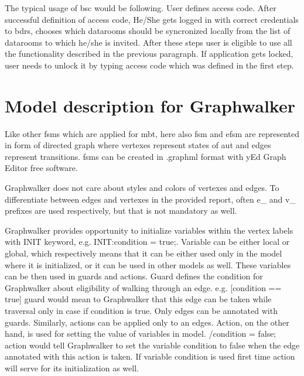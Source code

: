 \par
The typical usage of \acrshort{bsc} would be following. User defines access code. After successful definition of access code, He/She gets logged in with correct credentials to \acrshort{bdrs}, chooses which datarooms should be syncronized locally from the list of datarooms to which he/she is invited. After these steps user is eligible to use all the functionality described in the previous paragraph. If application gets locked, user needs to unlock it by typing access code which was defined in the first step.


\section{Model description for Graphwalker}
\par
Like other \acrshort{fsm}s which are applied for \acrshort{mbt}, here also \acrshort{fsm} and \acrshort{efsm} are represented in form of directed graph where vertexes represent states of \acrshort{aut} and edges represent transitions. \acrshort{fsm}s can be created in .graphml format with yEd Graph Editor free software.

\par
Graphwalker does not care about styles and colors of vertexes and edges. To differentiate between edges and vertexes in the provided report, often e\_ and v\_ prefixes are used respectively, but that is not mandatory as well.

\par
Graphwalker provides opportunity to initialize variables within the vertex labels with INIT keyword, e.g. INIT:condition = true;. Variable can be either local or global, which respectively means that it can be either used only in the model where it is initialized, or it can be used in other models as well. These variables can be then used in guards and actions. Guard defines the condition for Graphwalker about eligibility of walking through an edge. e.g. [condition == true] guard would mean to Graphwalker that this edge can be taken while traversal only in case if condition is true. Only edges can be annotated with guards. Similarly, actions can be applied only to an edges. Action, on the other hand, is used for setting the value of variables in model. /condition = false; action would tell Graphwalker to set the variable condition to false when the edge annotated with this action is taken. If variable condition is used first time action will serve for its initialization as well. 

